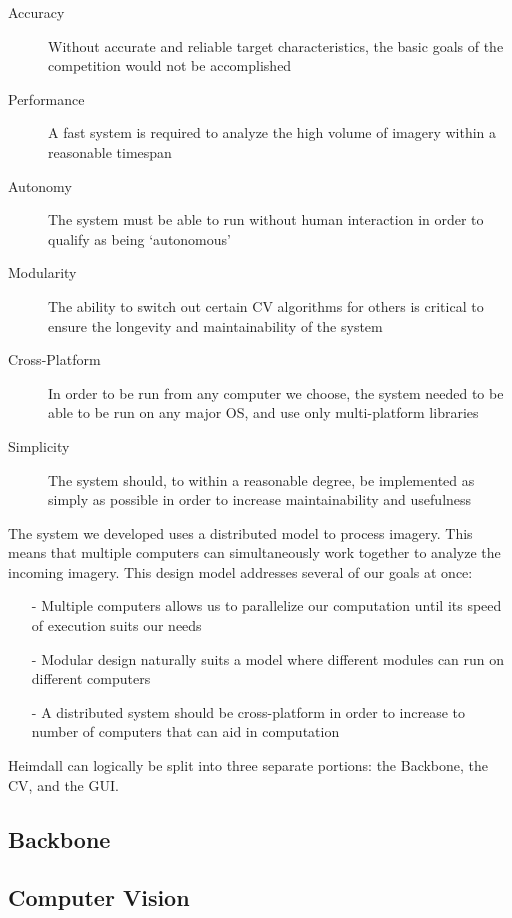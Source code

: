 \documentclass{article}
\begin{document}
\begin{description}
\item[Accuracy] Without accurate and reliable target characteristics, the basic goals of the competition would not be accomplished
\item[Performance] A fast system is required to analyze the high volume of imagery within a reasonable timespan
\item[Autonomy] The system must be able to run without human interaction in order to qualify as being `autonomous'
\item[Modularity] The ability to switch out certain CV algorithms for others is critical to ensure the longevity and maintainability of the system
\item[Cross-Platform] In order to be run from any computer we choose, the system needed to be able to be run on any major OS, and use only multi-platform libraries
\item[Simplicity] The system should, to within a reasonable degree, be implemented as simply as possible in order to increase maintainability and usefulness
\end{description}

The system we developed uses a distributed model to process imagery. This means that multiple computers can simultaneously work together to analyze the incoming imagery. This design model addresses several of our goals at once:

\begin{itemize}
\item[-] Multiple computers allows us to parallelize our computation until its speed of execution suits our needs
\item[-] Modular design naturally suits a model where different modules can run on different computers
\item[-] A distributed system should be cross-platform in order to increase to number of computers that can aid in computation
\end{itemize}
Heimdall can logically be split into three separate portions: the Backbone, the CV, and the GUI.

\subsection{Backbone}

\subsection{Computer Vision}
\end{document}
